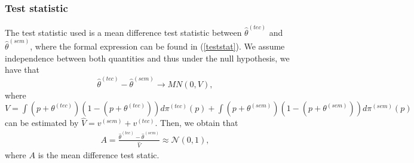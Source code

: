 \documentclass[12pt,twoside,a4paper]{article}
\begin{document}
\subsubsection*{Test statistic}
The test statistic used is a mean difference test statistic between $\widehat{\theta}^{(tec)}$ and  $\widehat{\theta}^{(sem)}$, where the formal expression can be found in (\ref{teststat}). We assume independence between both quantities and thus under the null hypothesis, we have that 
$$\widehat{\theta}^{(tec)} - \widehat{\theta}^{(sem)} {\rightarrow} MN(0,V),$$
where $V= \int (p + \theta^{(tec)})(1 - (p + \theta^{(tec)})) d\pi^{(tec)} (p) + \int (p + \theta^{(sem)})(1 - (p + \theta^{(sem)})) d\pi^{(sem)} (p)$ can be estimated by $\widehat{V} = v^{(sem)} + v^{(tec)}$. Then, we obtain that 
\begin{eqnarray}
\label{teststat}
A = \frac{\widehat{\theta}^{(tec)} - \widehat{\theta}^{(sem)}}{\widehat{V}} \approx \mathcal{N} (0,1),
\end{eqnarray}
where $A$ is the mean difference test static.






















\end{document}
